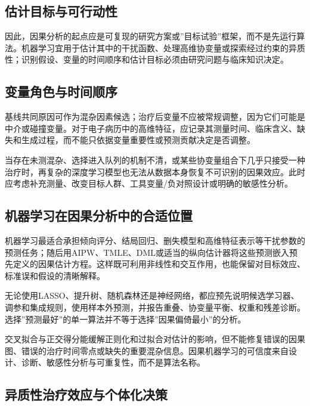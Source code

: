 \documentclass[
  chinese-hans,
  letterpaper,
  DIV=11,
  numbers=noendperiod]{scrreprt}
\begin{document}
\subsection{估计目标与可行动性}\label{ux4f30ux8ba1ux76eeux6807ux4e0eux53efux884cux52a8ux6027}

因此，因果分析的起点应是可复现的研究方案或''目标试验''框架，而不是先运行算法。机器学习宜用于估计其中的干扰函数、处理高维协变量或探索经过约束的异质性；识别假设、变量的时间顺序和估计目标必须由研究问题与临床知识决定。

\subsection{变量角色与时间顺序}\label{ux53d8ux91cfux89d2ux8272ux4e0eux65f6ux95f4ux987aux5e8f}

基线共同原因可作为混杂因素候选；治疗后变量不应被常规调整，因为它们可能是中介或碰撞变量。对于电子病历中的高维特征，应记录其测量时间、临床含义、缺失和生成过程，而不能只依据变量重要性或预测贡献决定是否调整。

当存在未测混杂、选择进入队列的机制不清，或某些协变量组合下几乎只接受一种治疗时，再复杂的深度学习模型也无法从数据本身恢复不可识别的因果效应。此时应考虑补充测量、改变目标人群、工具变量/负对照设计或明确的敏感性分析。

\subsection{机器学习在因果分析中的合适位置}\label{ux673aux5668ux5b66ux4e60ux5728ux56e0ux679cux5206ux6790ux4e2dux7684ux5408ux9002ux4f4dux7f6e}

机器学习最适合承担倾向评分、结局回归、删失模型和高维特征表示等干扰参数的预测任务；随后用AIPW、TMLE、DML或适当的纵向估计器将这些预测嵌入预先定义的因果估计方程。这样既可利用非线性和交互作用，也能保留对目标效应、标准误和假设的清晰解释。

无论使用LASSO、提升树、随机森林还是神经网络，都应预先说明候选学习器、调参和集成规则，使用样本外预测，并报告重叠、协变量平衡、权重和残差诊断。选择''预测最好''的单一算法并不等于选择''因果偏倚最小''的分析。

交叉拟合与正交得分能缓解正则化和过拟合对估计的影响，但不能修复错误的因果图、错误的治疗时间零点或缺失的重要混杂信息。因果机器学习的可信度来自设计、诊断、敏感性分析与可重复性，而不是算法名称。

\subsection{异质性治疗效应与个体化决策}\label{ux5f02ux8d28ux6027ux6cbbux7597ux6548ux5e94ux4e0eux4e2aux4f53ux5316ux51b3ux7b56}
\end{document}

